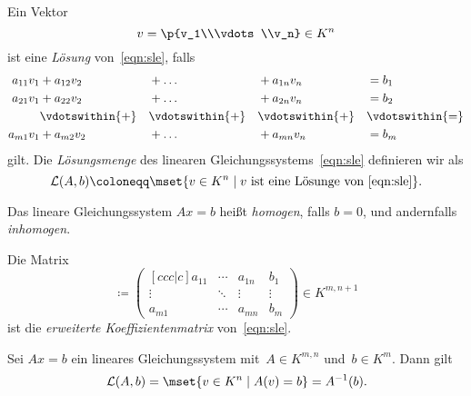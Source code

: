 \documentclass[a4paper]{article}
\begin{document}
\begin{definition}\label{def:sle:solution}
    Ein Vektor
    \begin{equation*}
        v = \p{v_1\\\vdots\\v_n} \in K^n
    \end{equation*}
    ist eine \emph{Lösung} von~\cref{eqn:sle}, falls
    \begin{alignat*}{4}
        a_{11}v_1 & + a_{12}v_2     &  & + \dots         &  & + a_{1n}v_n     &  & = b_1           \\
        a_{21}v_1 & + a_{22}v_2     &  & + \dots         &  & + a_{2n}v_n     &  & = b_2           \\
                  & \vdotswithin{+} &  & \vdotswithin{+} &  & \vdotswithin{+} &  & \vdotswithin{=} \\
        a_{m1}v_1 & + a_{m2}v_2     &  & + \dots         &  & + a_{mn}v_n     &  & = b_m           \\
    \end{alignat*}
    gilt. Die \emph{Lösungsmenge} des linearen Gleichungssystems~\cref{eqn:sle} definieren wir als
    \begin{equation*}
        \mathcal{L}(A,b) \coloneqq \mset{v \in K^n \mid v \text{ ist eine Lösunge von~\cref{eqn:sle}}}.
    \end{equation*}
\end{definition}

\begin{definition}
    Das lineare Gleichungssystem $Ax = b$ heißt \emph{homogen}, falls $b = 0$, und andernfalls \emph{inhomogen}.

    Die Matrix
    \begin{equation*}
        [A|b] \coloneqq \begin{pmatrix}[ccc|c]
            a_{11} & \cdots & a_{1n} & b_1    \\
            \vdots & \ddots & \vdots & \vdots \\
            a_{m1} & \cdots & a_{mn} & b_m
        \end{pmatrix} \in K^{m,n+1}
    \end{equation*}
    ist die \emph{erweiterte Koeffizientenmatrix} von~\cref{eqn:sle}.
\end{definition}

\begin{lemma}
    Sei $Ax = b$ ein lineares Gleichungssystem mit~$A \in K^{m,n}$ und~$b \in K^m$. Dann gilt
    \begin{equation*}
        \mathcal{L}(A,b) = \mset{v \in K^n \mid A(v) = b} = A^{-1}(b).
    \end{equation*}
\end{lemma}
\end{document}
